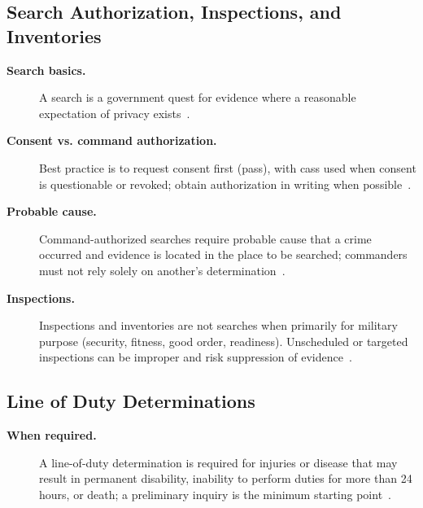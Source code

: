 \documentclass[../main.tex]{subfiles}
\begin{document}
\subsection{Search Authorization, Inspections, and Inventories}
\begin{description}
  \item[\textbf{Search basics.}] A search is a government quest for evidence where a reasonable expectation of privacy exists~\autocite{edo-5-1-1-naval-justice-standards-2025}.
  \item[\textbf{Consent vs. command authorization.}] Best practice is to request consent first (\ac{pass}), with \ac{cass} used when consent is questionable or revoked; obtain authorization in writing when possible~\autocite{edo-5-1-1-naval-justice-standards-2025}.
  \item[\textbf{Probable cause.}] Command-authorized searches require probable cause that a crime occurred and evidence is located in the place to be searched; commanders must not rely solely on another's determination~\autocite{edo-5-1-1-naval-justice-standards-2025}.
  \item[\textbf{Inspections.}] Inspections and inventories are not searches when primarily for military purpose (security, fitness, good order, readiness). Unscheduled or targeted inspections can be improper and risk suppression of evidence~\autocite{edo-5-1-1-naval-justice-standards-2025}.
\end{description}

\subsection{Line of Duty Determinations}
\begin{description}
  \item[\textbf{When required.}] A line-of-duty determination is required for injuries or disease that may result in permanent disability, inability to perform duties for more than 24 hours, or death; a preliminary inquiry is the minimum starting point~\autocite{edo-5-1-1-naval-justice-standards-2025}.
\end{description}
\end{document}
